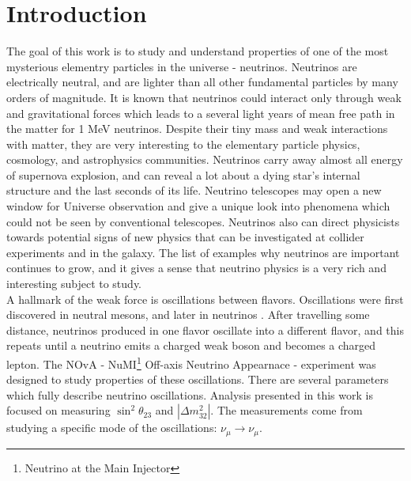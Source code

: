 \chapter{Introduction}
\label{intro_chapter}

The goal of this work is to study and understand properties of one of the most 
mysterious elementry particles in the universe - neutrinos. Neutrinos are electrically
neutral, and are lighter than all other fundamental particles by many orders of magnitude.
It is known that neutrinos could interact only through weak and 
gravitational forces which leads to a several light years of mean free path in 
the matter for 1 MeV neutrinos. Despite their tiny mass and weak interactions
with matter, they are very interesting to the elementary particle physics, cosmology, and
astrophysics communities. Neutrinos carry away almost all energy of supernova 
explosion, and can reveal a lot about a dying star's internal structure and the last 
seconds of its life. Neutrino telescopes may open a new window for Universe observation 
and give a unique look into phenomena which could not be seen by conventional 
telescopes. Neutrinos also can direct physicists
towards potential signs of new physics that can be investigated at collider experiments
\cite{seeSawAndParityViolation} and in the galaxy. The list of examples why neutrinos are 
important continues to grow, and it gives a sense that neutrino physics is a 
very rich and interesting subject to study.\\

A hallmark of the weak force is oscillations between flavors.  Oscillations were first
discovered in neutral mesons, and later in neutrinos \cite{kamiokandeTwo, solarNuSummary,
dayaBayResults, NOvAresults, mainzPhaseIIResults, t2kResults}. After travelling some
distance, neutrinos produced in one flavor oscillate into a different flavor, and this repeats
until a neutrino emits a charged weak boson and becomes a charged lepton. The NOvA - 
NuMI\footnote{Neutrino at the Main Injector} Off-axis Neutrino Appearnace - experiment
was designed to study properties of these oscillations. There are several
parameters which fully describe neutrino oscillations. Analysis presented in this work 
is focused on measuring $\sin^2\theta_{23}$ and $|\Delta m^2_{32}|$. The measurements 
come from studying a specific mode of the oscillations: $\nu_\mu \rightarrow \nu_\mu$.\\

